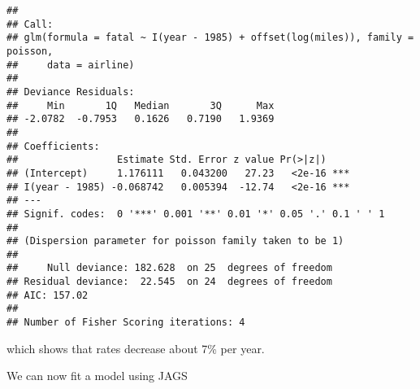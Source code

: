 \documentclass[]{article}
\newenvironment{Shaded}{\begin{snugshade}}{\end{snugshade}}
\newcommand{\KeywordTok}[1]{\textcolor[rgb]{0.13,0.29,0.53}{\textbf{#1}}}
\newcommand{\DataTypeTok}[1]{\textcolor[rgb]{0.13,0.29,0.53}{#1}}
\newcommand{\DecValTok}[1]{\textcolor[rgb]{0.00,0.00,0.81}{#1}}
\newcommand{\FloatTok}[1]{\textcolor[rgb]{0.00,0.00,0.81}{#1}}
\newcommand{\StringTok}[1]{\textcolor[rgb]{0.31,0.60,0.02}{#1}}
\newcommand{\CommentTok}[1]{\textcolor[rgb]{0.56,0.35,0.01}{\textit{#1}}}
\newcommand{\OtherTok}[1]{\textcolor[rgb]{0.56,0.35,0.01}{#1}}
\newcommand{\OperatorTok}[1]{\textcolor[rgb]{0.81,0.36,0.00}{\textbf{#1}}}
\newcommand{\NormalTok}[1]{#1}
\begin{document}
\begin{verbatim}
## 
## Call:
## glm(formula = fatal ~ I(year - 1985) + offset(log(miles)), family = poisson, 
##     data = airline)
## 
## Deviance Residuals: 
##     Min       1Q   Median       3Q      Max  
## -2.0782  -0.7953   0.1626   0.7190   1.9369  
## 
## Coefficients:
##                 Estimate Std. Error z value Pr(>|z|)    
## (Intercept)     1.176111   0.043200   27.23   <2e-16 ***
## I(year - 1985) -0.068742   0.005394  -12.74   <2e-16 ***
## ---
## Signif. codes:  0 '***' 0.001 '**' 0.01 '*' 0.05 '.' 0.1 ' ' 1
## 
## (Dispersion parameter for poisson family taken to be 1)
## 
##     Null deviance: 182.628  on 25  degrees of freedom
## Residual deviance:  22.545  on 24  degrees of freedom
## AIC: 157.02
## 
## Number of Fisher Scoring iterations: 4
\end{verbatim}

which shows that rates decrease about 7\% per year.

We can now fit a model using JAGS

\begin{Shaded}
\end{Shaded}
\end{document}
